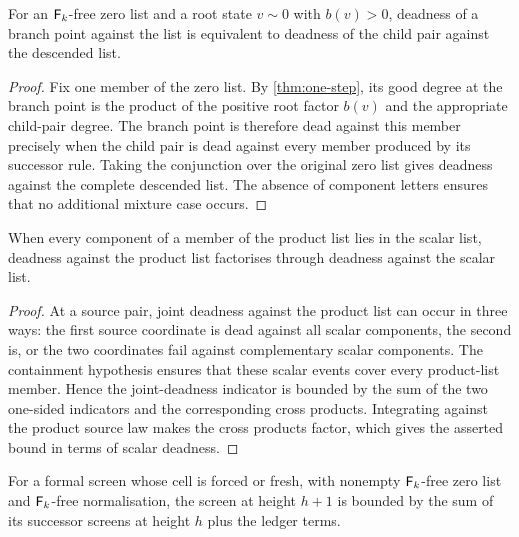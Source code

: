 \begin{lemma}
\label{thm:descent}
\leanok
{}
For an $\mathsf{F}_k$-free zero list and a root state $v\sim0$ with $b(v)>0$, deadness of a branch
point against the list is equivalent to deadness of the child pair against the descended list.
\end{lemma}

\begin{proof}
\leanok
{}
Fix one member of the zero list. By \cref{thm:one-step}, its good degree at the branch point is
the product of the positive root factor $b(v)$ and the appropriate child-pair degree. The branch
point is therefore dead against this member precisely when the child pair is dead against every
member produced by its successor rule. Taking the conjunction over the original zero list gives
deadness against the complete descended list. The absence of component letters ensures that no
additional mixture case occurs.
\end{proof}

\begin{lemma}
\label{thm:hall-factor}
\leanok
When every component of a member of the product list lies in the scalar list, deadness against
the product list factorises through deadness against the scalar list.
\end{lemma}

\begin{proof}
\leanok
{}
At a source pair, joint deadness against the product list can occur in three ways: the first source
coordinate is dead against all scalar components, the second is, or the two coordinates fail
against complementary scalar components. The containment hypothesis ensures that these scalar
events cover every product-list member. Hence the joint-deadness indicator is bounded by the sum
of the two one-sided indicators and the corresponding cross products. Integrating against the
product source law makes the cross products factor, which gives the asserted bound in terms of
scalar deadness.
\end{proof}

\begin{lemma}
\label{thm:screen-rows}
\leanok
{}
For a formal screen whose cell is forced or fresh, with nonempty $\mathsf{F}_k$-free zero list and
$\mathsf{F}_k$-free normalisation, the screen at height $h+1$ is bounded by the sum of its successor
screens at height $h$ plus the ledger terms.
\end{lemma}

